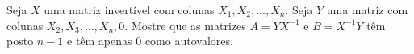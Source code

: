 Seja \(X\) uma matriz invertível com colunas \(X_{1},X_{2},\dots,X_{n}\). Seja \(Y\) uma matriz com colunas \(X_{2},X_{3},\dots,X_{n},0\). Mostre que as matrizes \(A=YX^{-1}\) e \(B=X^{-1}Y\) têm posto \(n-1\) e têm apenas \(0\) como autovalores.
